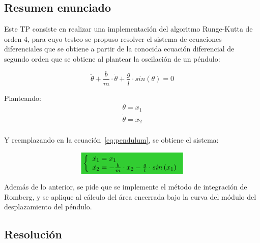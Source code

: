 
\subsection{Resumen enunciado}



\normalfont

Este TP consiste en realizar una implementación del algoritmo Runge-Kutta de orden 4, para cuyo testeo se propuso resolver el sistema de ecuaciones diferenciales que se obtiene a partir de la conocida ecuación diferencial de segundo orden que se obtiene al plantear la oscilación de un péndulo:


\begin{equation}
\ddot{\theta} + \frac{b}{m} \cdot \dot{\theta} + \frac{g}{l} \cdot sin \left( \theta \right) = 0
\label{eq:pendulum}
\end{equation}


Planteando:
\begin{equation*}
                \begin{array}{ll}
                  \theta = x_{1} \\
                  \dot{\theta} = x_{2} \\                
                \end{array}
\end{equation*}

Y reemplazando en la ecuación~\eqref{eq:pendulum}, se obtiene el sistema:

\begin{equation}
             \mathcolorbox{EQColor}{
             \left\{
                \begin{array}{ll}
                  \dot{x_{1}} = x_{1} \\
                  \dot{x_{2}} = - \frac{b}{m} \cdot x_{2} - \frac{g}{l} \cdot sin \left( x_{1} \right) \\
                \end{array}
              \right. 
              }
\end{equation}

Además de lo anterior, se pide que se implemente el método de integración de Romberg, y se aplique al cálculo del área encerrada bajo la curva del módulo del desplazamiento del péndulo.


\subsection{Resolución}

